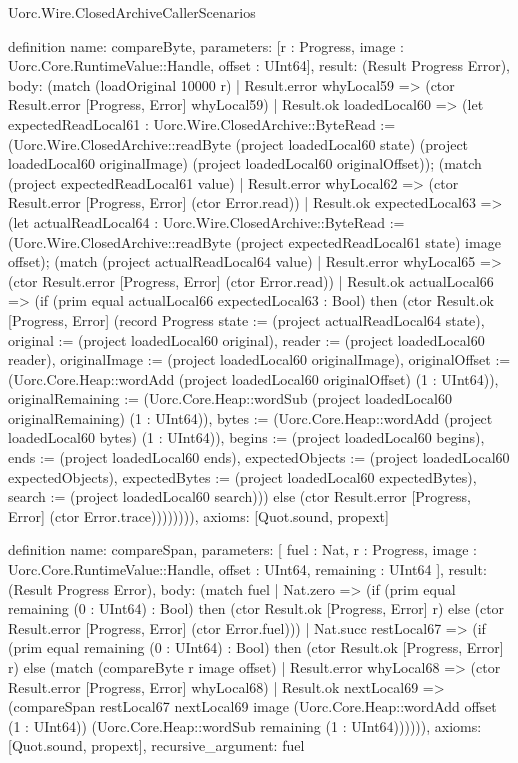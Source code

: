 \begin{lexlean}{Uorc.Wire.ClosedArchiveCallerScenarios}
\begin{semanticmodule}
definition{
  name: compareByte,
  parameters: [r : Progress, image : Uorc.Core.RuntimeValue::Handle, offset : UInt64],
  result: (Result Progress Error),
  body: (match (loadOriginal 10000 r)
    | Result.error whyLocal59 => (ctor Result.error [Progress, Error] whyLocal59)
    | Result.ok loadedLocal60 => (let expectedReadLocal61 : Uorc.Wire.ClosedArchive::ByteRead := (Uorc.Wire.ClosedArchive::readByte (project loadedLocal60 state) (project loadedLocal60 originalImage) (project loadedLocal60 originalOffset)); (match (project expectedReadLocal61 value)
      | Result.error whyLocal62 => (ctor Result.error [Progress, Error] (ctor Error.read))
      | Result.ok expectedLocal63 => (let actualReadLocal64 : Uorc.Wire.ClosedArchive::ByteRead := (Uorc.Wire.ClosedArchive::readByte (project expectedReadLocal61 state) image offset); (match (project actualReadLocal64 value)
        | Result.error whyLocal65 => (ctor Result.error [Progress, Error] (ctor Error.read))
        | Result.ok actualLocal66 => (if (prim equal actualLocal66 expectedLocal63 : Bool) then (ctor Result.ok [Progress, Error] (record Progress {state := (project actualReadLocal64 state), original := (project loadedLocal60 original), reader := (project loadedLocal60 reader), originalImage := (project loadedLocal60 originalImage), originalOffset := (Uorc.Core.Heap::wordAdd (project loadedLocal60 originalOffset) (1 : UInt64)), originalRemaining := (Uorc.Core.Heap::wordSub (project loadedLocal60 originalRemaining) (1 : UInt64)), bytes := (Uorc.Core.Heap::wordAdd (project loadedLocal60 bytes) (1 : UInt64)), begins := (project loadedLocal60 begins), ends := (project loadedLocal60 ends), expectedObjects := (project loadedLocal60 expectedObjects), expectedBytes := (project loadedLocal60 expectedBytes), search := (project loadedLocal60 search)})) else (ctor Result.error [Progress, Error] (ctor Error.trace)))))))),
  axioms: [Quot.sound, propext]
}

definition{
  name: compareSpan,
  parameters: [
    fuel : Nat,
    r : Progress,
    image : Uorc.Core.RuntimeValue::Handle,
    offset : UInt64,
    remaining : UInt64
  ],
  result: (Result Progress Error),
  body: (match fuel
    | Nat.zero => (if (prim equal remaining (0 : UInt64) : Bool) then (ctor Result.ok [Progress, Error] r) else (ctor Result.error [Progress, Error] (ctor Error.fuel)))
    | Nat.succ restLocal67 => (if (prim equal remaining (0 : UInt64) : Bool) then (ctor Result.ok [Progress, Error] r) else (match (compareByte r image offset)
      | Result.error whyLocal68 => (ctor Result.error [Progress, Error] whyLocal68)
      | Result.ok nextLocal69 => (compareSpan restLocal67 nextLocal69 image (Uorc.Core.Heap::wordAdd offset (1 : UInt64)) (Uorc.Core.Heap::wordSub remaining (1 : UInt64)))))),
  axioms: [Quot.sound, propext],
  recursive_argument: fuel
}


\end{semanticmodule}
\end{lexlean}
